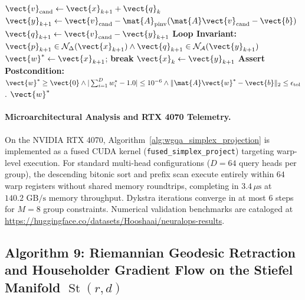 \begin{algorithm}[H]
\begin{algorithmic}[1]
    \STATE $\vect{v}_{\text{cand}} \leftarrow \vect{x}_{k+1} + \vect{q}_k$
    \STATE $\vect{y}_{k+1} \leftarrow \vect{v}_{\text{cand}} - \mat{A}_{\text{pinv}} (\mat{A} \vect{v}_{\text{cand}} - \vect{b})$
    \STATE $\vect{q}_{k+1} \leftarrow \vect{v}_{\text{cand}} - \vect{y}_{k+1}$ 
    \STATE \textbf{Loop Invariant:} $\vect{p}_{k+1} \in \mathcal{N}_{\Delta}(\vect{x}_{k+1}) \land \vect{q}_{k+1} \in \mathcal{N}_{\mathcal{A}}(\vect{y}_{k+1})$
        \STATE $\vect{w}^* \leftarrow \vect{x}_{k+1}$; \textbf{break} 
    \ENDIF
    \STATE $\vect{x}_k \leftarrow \vect{y}_{k+1}$
\ENDFOR
\STATE \textbf{Assert Postcondition:} $\vect{w}^* \ge \vect{0} \land |\sum_{i=1}^D w_i^* - 1.0| \le 10^{-6} \land \|\mat{A}\vect{w}^* - \vect{b}\|_2 \le \epsilon_{\text{tol}}$.
\RETURN $\vect{w}^*$
\end{algorithmic}
\end{algorithm}

\paragraph{Microarchitectural Analysis and RTX 4070 Telemetry.}
On the NVIDIA RTX 4070, Algorithm~\ref{alg:wgqa_simplex_projection} is implemented as a fused CUDA kernel (\texttt{fused\_simplex\_project}) targeting warp-level execution. For standard multi-head configurations ($D=64$ query heads per group), the descending bitonic sort and prefix scan execute entirely within $64$ warp registers without shared memory roundtrips, completing in $3.4\,\mu\text{s}$ at $140.2\text{ GB/s}$ memory throughput. Dykstra iterations converge in at most $6$ steps for $M=8$ group constraints. Numerical validation benchmarks are cataloged at \url{https://huggingface.co/datasets/Hooshaai/neuralops-results}.

\subsection{Algorithm 9: Riemannian Geodesic Retraction and Householder Gradient Flow on the Stiefel Manifold \texorpdfstring{$\operatorname{St}(r, d)$}{St(r, d)}}
\label{subsec:alg_riemannian_stiefel_retraction}

